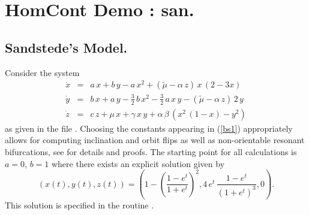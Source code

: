 \documentclass[12pt]{report}
\begin{document}
\chapter{ {\cal HomCont} Demo : san.} \label{ch:HomCont_san}

\section{ Sandstede's Model.}
\newcommand{\ti}{\tilde}
Consider the system \cite{Sa:95b}
\begin{equation} \label{bs1} \begin{array}{rcl}
\dot{x} & = & a \, x + b \, y - a \, x^2 + (\ti \mu - \alpha \, z) \, x
\, (2-3x) \\
\dot{y} & = & b \, x + a \, y - \frac{3}{2} \, b \, x^2 - 
\frac{3}{2} \, a \, x \, y - (\ti \mu - \alpha \, z) \, 2 \, y \\
\dot{z} & = & c \, z + \mu \, x + \gamma\, x\, y + \alpha \, 
\beta \, (x^2 \, (1-x) - y^2)

\end{array} \end{equation}
as given in the file .
Choosing the constants appearing
in (\ref{bs1}) appropriately allows for computing inclination and
orbit flips as well as non-orientable resonant bifurcations, see
\cite{Sa:95b} for details and proofs. The starting point for all
calculations is $a=0$, $b=1$ where there exists an explicit solution
given by  
$$ 
(x(t),y(t),z(t)) = 
\left( 1 - \left(\frac{1-e^t}{1+e^t}\right)^2 , 4 \, e^t \,
\frac{1-e^t}{(1+e^t)^3} , 0 \right). 
$$
This solution is specified in the routine .
\end{document}
